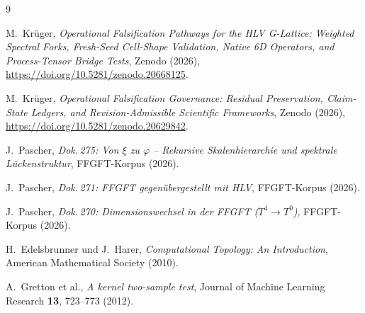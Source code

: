 \begin{thebibliography}{9}

M.~Krüger,
\emph{Operational Falsification Pathways for the HLV G-Lattice:
Weighted Spectral Forks, Fresh-Seed Cell-Shape Validation, Native 6D
Operators, and Process-Tensor Bridge Tests},
Zenodo (2026), \url{https://doi.org/10.5281/zenodo.20668125}.

M.~Krüger,
\emph{Operational Falsification Governance: Residual Preservation,
Claim-State Ledgers, and Revision-Admissible Scientific Frameworks},
Zenodo (2026), \url{https://doi.org/10.5281/zenodo.20629842}.

J.~Pascher, \emph{Dok.\,275: Von $\xi$ zu $\varphi$ -- Rekursive
Skalenhierarchie und spektrale Lückenstruktur}, FFGFT-Korpus (2026).

J.~Pascher, \emph{Dok.\,271: FFGFT gegenübergestellt mit HLV},
FFGFT-Korpus (2026).

J.~Pascher, \emph{Dok.\,270: Dimensionswechsel in der FFGFT
($T^4 \to T^0$)}, FFGFT-Korpus (2026).

H.~Edelsbrunner und J.~Harer, \emph{Computational Topology: An
Introduction}, American Mathematical Society (2010).

A.~Gretton et al., \emph{A kernel two-sample test},
Journal of Machine Learning Research \textbf{13}, 723--773 (2012).

\end{thebibliography}
